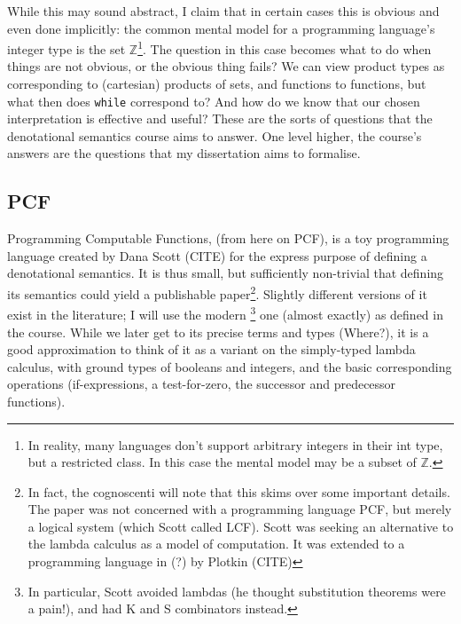 \documentclass[12pt,a4paper,twoside,openright]{report}
\begin{document}
While this may sound abstract, I claim that in certain cases this is obvious and even done implicitly: the common mental model for a programming language's integer type is the set $\mathbb{Z}$\footnote{In reality, many languages don't support arbitrary integers in their int type, but a restricted class. In this case the mental model may be a subset of $\mathbb{Z}$.}. The question in this case becomes what to do when things are not obvious, or the obvious thing fails? We can view product types as corresponding to (cartesian) products of sets, and functions to functions, but what then does \texttt{while} correspond to? And how do we know that our chosen interpretation is effective and useful? These are the sorts of questions that the denotational semantics course aims to answer. One level higher, the course's answers are the questions that my dissertation aims to formalise. 
\subsection{PCF}
Programming Computable Functions, (from here on PCF), is a toy programming language created by Dana Scott (CITE) for the express purpose of defining a denotational semantics. It is thus small, but sufficiently non-trivial that defining its semantics could yield a publishable paper\footnote{In fact, the cognoscenti will note that this skims over some important details. The paper was not concerned with a programming language PCF, but merely a logical system (which Scott called LCF). Scott was seeking an alternative to the lambda calculus as a model of computation. It was extended to a programming language in (?) by Plotkin (CITE)}. Slightly different versions of it exist in the literature; I will use the modern \footnote{In particular, Scott avoided lambdas (he thought substitution theorems were a pain!), and had K and S combinators instead.} one (almost exactly) as defined in the course. While we later get to its precise terms and types (Where?), it is a good approximation to think of it as a variant on the simply-typed lambda calculus, with ground types of booleans and integers, and the basic corresponding operations (if-expressions, a test-for-zero, the successor and predecessor functions). 
\end{document}
